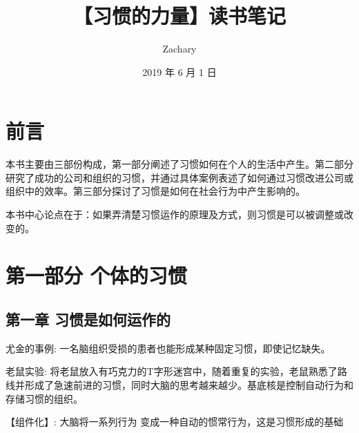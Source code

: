 \documentclass[geye,green,pad,cn]{elegantnote}
\title{【习惯的力量】读书笔记}
\author{Zachary}
\date{2019 年 6 月 1 日}
\begin{document}
\maketitle
\tableofcontents

\section{前言}
本书主要由三部份构成，第一部分阐述了习惯如何在个人的生活中产生。第二部分研究了成功的公司和组织的习惯，并通过具体案例表述了如何通过习惯改进公司或组织中的效率。第三部分探讨了习惯是如何在社会行为中产生影响的。

本书中心论点在于：如果弄清楚习惯运作的原理及方式，则习惯是可以被调整或改变的。

\section{第一部分 个体的习惯}
\subsection{第一章 习惯是如何运作的}
尤金的事例: 一名脑组织受损的患者也能形成某种固定习惯，即使记忆缺失。

老鼠实验:  将老鼠放入有巧克力的T字形迷宫中，随着重复的实验，老鼠熟悉了路线并形成了急速前进的习惯，同时大脑的思考越来越少。基底核是控制自动行为和存储习惯的组织。

【组件化】: 大脑将一系列行为  变成一种自动的惯常行为，这是习惯形成的基础
\end{document}
